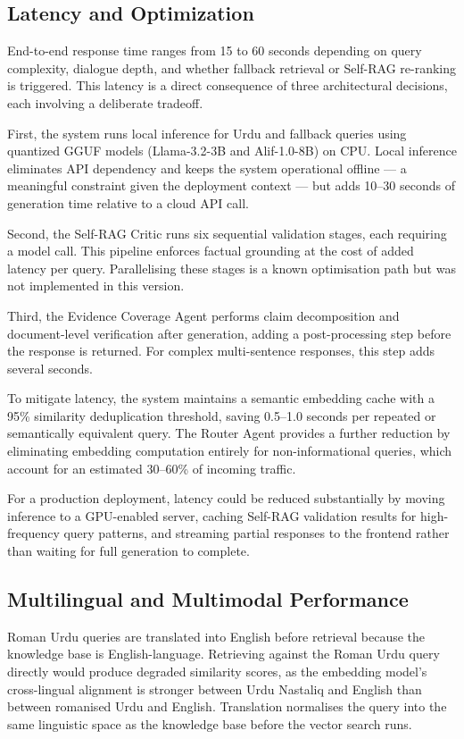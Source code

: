 \subsection{Latency and Optimization}

End-to-end response time ranges from 15 to 60 seconds depending on query 
complexity, dialogue depth, and whether fallback retrieval or Self-RAG 
re-ranking is triggered. This latency is a direct consequence of three 
architectural decisions, each involving a deliberate tradeoff.

First, the system runs local inference for Urdu and fallback queries using 
quantized GGUF models (Llama-3.2-3B and Alif-1.0-8B) on CPU. Local inference 
eliminates API dependency and keeps the system operational offline — a meaningful 
constraint given the deployment context — but adds 10--30 seconds of generation 
time relative to a cloud API call.

Second, the Self-RAG Critic runs six sequential validation stages, each 
requiring a model call. This pipeline enforces factual grounding at the cost of 
added latency per query. Parallelising these stages is a known optimisation path 
but was not implemented in this version.

Third, the Evidence Coverage Agent performs claim decomposition and 
document-level verification after generation, adding a post-processing step 
before the response is returned. For complex multi-sentence responses, this step 
adds several seconds.

To mitigate latency, the system maintains a semantic embedding cache with a 
95\% similarity deduplication threshold, saving 0.5--1.0 seconds per repeated 
or semantically equivalent query. The Router Agent provides a further reduction 
by eliminating embedding computation entirely for non-informational queries, 
which account for an estimated 30--60\% of incoming traffic.

For a production deployment, latency could be reduced substantially by moving 
inference to a GPU-enabled server, caching Self-RAG validation results for 
high-frequency query patterns, and streaming partial responses to the frontend 
rather than waiting for full generation to complete.

\subsection{Multilingual and Multimodal Performance}

Roman Urdu queries are translated into English before retrieval because the 
knowledge base is English-language. Retrieving against the Roman Urdu query 
directly would produce degraded similarity scores, as the embedding model's 
cross-lingual alignment is stronger between Urdu Nastaliq and English than 
between romanised Urdu and English. Translation normalises the query into the 
same linguistic space as the knowledge base before the vector search runs.

